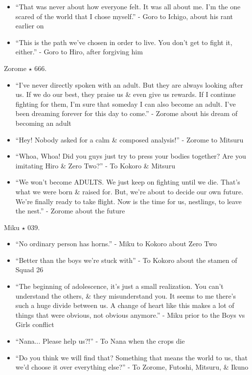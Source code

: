 \documentclass{article}
\begin{document}
\begin{enumerate}
\begin{itemize}
    	\item ``That was never about how everyone felt. It was all about me. I'm the one scared of the world that I chose myself.'' - Goro to Ichigo, about his rant earlier on
    	\item ``This is the path we've chosen in order to live. You don't get to fight it, either.'' - Goro to Hiro, after forgiving him
    \end{itemize}
    {\sc Zorome $\star$ 666.}
    \begin{itemize}
    	\item ``I've never directly spoken with an adult. But they are always looking after us. If we do our best, they praise us \& even give us rewards. If I continue fighting for them, I'm sure that someday I can also become an adult. I've been dreaming forever for this day to come.'' - Zorome about his dream of becoming an adult
    	\item ``Hey! Nobody asked for a calm \& composed analysis!'' - Zorome to Mitsuru
    	\item ``Whoa, Whoa! Did you guys just try to press your bodies together? Are you imitating Hiro \& Zero Two?'' - To Kokoro \& Mitsuru
    	\item ``We won't become ADULTS. We just keep on fighting until we die. That's what we were born \& raised for. But, we're about to decide our own future. We're finally ready to take flight. Now is the time for us, nestlings, to leave the nest.'' - Zorome about the future
    \end{itemize}
    {\sc Miku $\star$ 039.}
    \begin{itemize}
    	\item ``No ordinary person has horns.'' - Miku to Kokoro about Zero Two
    	\item ``Better than the boys we're stuck with'' - To Kokoro about the stamen of Squad 26
    	\item ``The beginning of adolescence, it's just a small realization. You can't understand the others, \& they misunderstand you. It seems to me there's such a huge divide between us. A change of heart like this makes a lot of things that were obvious, not obvious anymore.'' - Miku prior to the Boys vs Girls conflict
    	\item ``Nana... Please help us?!'' - To Nana when the crops die
    	\item ``Do you think we will find that? Something that means the world to us, that we'd choose it over everything else?'' - To Zorome, Futoshi, Mitsuru, \& Ikuno

\end{itemize}
\end{enumerate}
\end{document}
